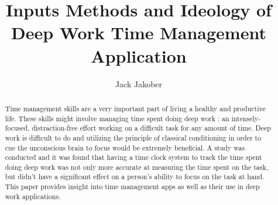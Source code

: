 \documentclass[sigconf]{acmart}
\begin{document}
\title{Inputs Methods and Ideology of Deep Work Time Management Application}


\author{Jack Jakober}

% 


\begin{abstract}
  Time management skills are a very important part of living a healthy and productive life. These skills might involve managing time spent doing deep work : an intensely-focused, distraction-free effort working on a difficult task for any amount of time. Deep work is difficult to do and utilizing the principle of classical conditioning in order to cue the unconscious brain to focus would be extremely beneficial. A study was conducted and it was found that having a time clock system to track the time spent doing deep work was not only more accurate at measuring the time spent on the task, but didn't have a significant effect on a person's ability to focus on the task at hand. This paper provides insight into time management apps as well as their use in deep work applications.
\end{abstract}


\maketitle
\end{document}
